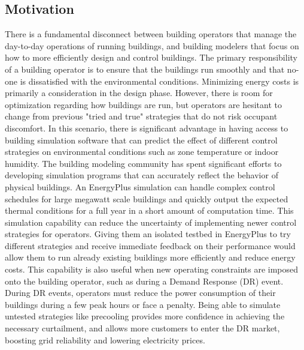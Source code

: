 \subsection{Motivation}
There is a fundamental disconnect between building operators that manage the day-to-day operations of running buildings, and building modelers that focus on how to more efficiently design and control buildings. The primary responsibility of a building operator is to ensure that the buildings run smoothly and that no-one is dissatisfied with the environmental conditions. Minimizing energy costs is primarily a consideration in the design phase. However, there is room for optimization regarding how buildings are run, but operators are hesitant to change from previous "tried and true" strategies that do not risk occupant discomfort. In this scenario, there is significant advantage in having access to building simulation software that can predict the effect of different control strategies on environmental conditions such as zone temperature or indoor humidity.
The building modeling community has spent significant efforts to developing simulation programs that can accurately reflect the behavior of physical buildings. An EnergyPlus simulation can handle complex control schedules for large megawatt scale buildings and quickly output the expected thermal conditions for a full year in a short amount of computation time. This simulation capability can reduce the uncertainty of implementing newer control strategies for operators. Giving them an isolated testbed in EnergyPlus to try different strategies and receive immediate feedback on their performance would allow them to run already existing buildings more efficiently and reduce energy costs.
This capability is also useful when new operating constraints are imposed onto the building operator, such as during a Demand Response (DR) event. During DR events, operators must reduce the power consumption of their buildings during a few peak hours or face a penalty. Being able to simulate untested strategies like precooling provides more confidence in achieving the necessary curtailment, and allows more customers to enter the DR market, boosting grid reliability and lowering electricity prices.

